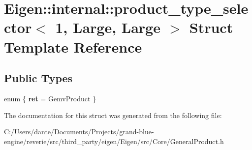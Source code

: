 \hypertarget{struct_eigen_1_1internal_1_1product__type__selector_3_011_00_01_large_00_01_large_01_4}{}\section{Eigen\+::internal\+::product\+\_\+type\+\_\+selector$<$ 1, Large, Large $>$ Struct Template Reference}
\label{struct_eigen_1_1internal_1_1product__type__selector_3_011_00_01_large_00_01_large_01_4}
\subsection*{Public Types}
\begin{DoxyCompactItemize}
\item 
\mbox{\label{struct_eigen_1_1internal_1_1product__type__selector_3_011_00_01_large_00_01_large_01_4_aefa5dcfffe57b9017395d8a83fec13b1}} 
enum \{ {\bfseries ret} = Gemv\+Product
 \}
\end{DoxyCompactItemize}


The documentation for this struct was generated from the following file\+:\begin{DoxyCompactItemize}
\item 
C\+:/\+Users/dante/\+Documents/\+Projects/grand-\/blue-\/engine/reverie/src/third\+\_\+party/eigen/\+Eigen/src/\+Core/General\+Product.\+h\end{DoxyCompactItemize}
